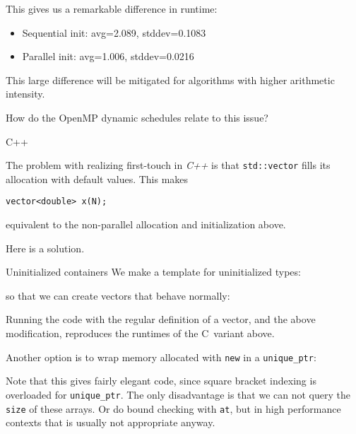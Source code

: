 This gives us a remarkable difference in runtime:
\begin{itemize}
\item
  Sequential init: avg=2.089, stddev=0.1083
\item
  Parallel init: avg=1.006, stddev=0.0216
\end{itemize}
This large difference will be mitigated
for algorithms with higher arithmetic intensity.

\begin{exercise}
  How do the OpenMP dynamic schedules relate to this issue?
\end{exercise}

 {C++}

\lstset{language=C++}

The problem with realizing first-touch in \emph{C++}%
%
is that \lstinline+std::vector+ fills its allocation with default values.
This makes
\begin{lstlisting}
vector<double> x(N);
\end{lstlisting}
equivalent to the non-parallel allocation and initialization above.

Here is a solution.
\begin{cppnote}{Uninitialized containers}
  \label{cpp:uninitial}
  We make a template for uninitialized types:

  so that we can create vectors that behave normally:
\end{cppnote}

Running the code with the regular definition of a vector,
and the above modification,
reproduces the runtimes of the C~variant above.

Another option is to wrap memory allocated with \lstinline{new}
in a \lstinline+unique_ptr+:
%

Note that this gives fairly elegant code,
since square bracket indexing is overloaded for \lstinline+unique_ptr+.
The only disadvantage is that we can not query the \lstinline{size}
of these arrays. Or do bound checking with \lstinline{at},
but in high performance contexts that is usually not appropriate anyway.

\lstset{language=C}

